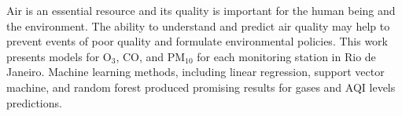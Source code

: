Air is an essential resource and its quality is important for the human being
and the environment. The ability to understand and predict air quality may
help to prevent events of poor quality and formulate environmental policies.
This work presents models for O$_3$, CO, and PM$_{10}$ for each monitoring
station in Rio de Janeiro. Machine learning methods, including linear
regression, support vector machine, and random forest produced promising
results for gases and AQI levels predictions. 

\vspace{6mm}